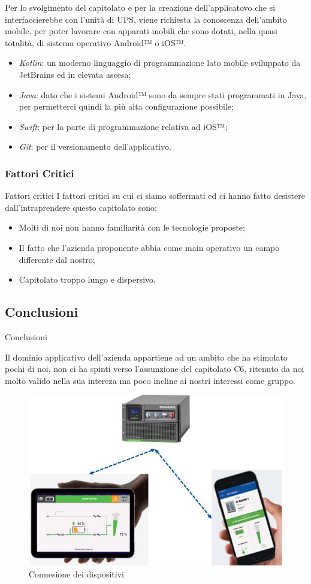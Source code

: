 \documentclass[11pt]{article}
\begin{document}
        Per lo svolgimento del capitolato e per la creazione dell'applicatovo che si interfaccierebbe con l'unità di UPS, viene richiesta la conoscenza dell'ambito mobile, per poter lavorare con apparati mobili che sono dotati, nella quasi totalità, di sistema operativo Android™ o iOS™.
        \begin{itemize}
            \item \textit{Kotlin}: un moderno linguaggio di programmazione lato mobile sviluppato da JetBrains ed in elevata ascesa;
            \item \textit{Java}: dato che i sistemi Android™ sono da sempre stati programmati in Java, per permetterci quindi la più alta configurazione possibile;
            \item \textit{Swift}: per la parte di programmazione relativa ad iOS™;
            \item \textit{Git}: per il versionamento dell'applicativo.
        \end{itemize}
    
    \subsubsection{Fattori Critici} Fattori critici
    I fattori critici su cui ci siamo soffermati ed ci hanno fatto desistere dall'intraprendere questo capitolato sono:
    \begin{itemize}
            \item Molti di noi non hanno familiarità con le tecnologie proposte;
            \item Il fatto che l'azienda proponente abbia come main operativo un campo differente dal nostro; 
            \item Capitolato troppo lungo e dispersivo.
        \end{itemize}
    \subsection{Conclusioni} Conclusioni
    
    Il dominio applicativo dell'azienda appartiene ad un ambito che ha stimolato pochi di noi, non ci ha spinti verso l'assunzione del capitolato C6, ritenuto da noi molto valido nella sua intereza ma poco incline ai nostri interessi come gruppo.
    
    \begin{figure}[h!]
        \centering
        \includegraphics[scale=0.4]{Res/SocomecConnection.png}
        \caption{Connesione dei dispositivi}
        \label{socom}
    \end{figure}
\end{document}
